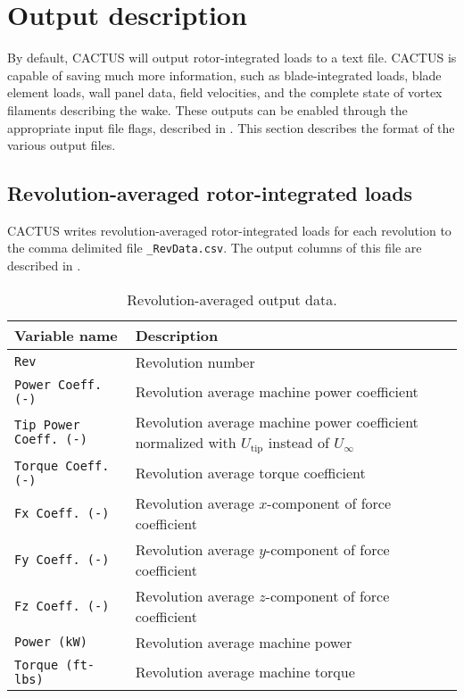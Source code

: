 \chapter{Output description}
By default, CACTUS will output rotor-integrated loads to a text file. CACTUS is capable of saving much more information, such as blade-integrated loads, blade element loads, wall panel data, field velocities, and the complete state of vortex filaments describing the wake. These outputs can be enabled through the appropriate input file flags, described in . This section describes the format of the various output files.

\section{Revolution-averaged rotor-integrated loads}
CACTUS writes revolution-averaged rotor-integrated loads for each revolution to the comma delimited file \texttt{\_RevData.csv}. The output columns of this file are described in .

\begin{table}[!htbp]
\centering
\caption{Revolution-averaged output data.}
\label{tbl:output_vars_rev}
\begin{tabular}{p{}p{}}
\toprule
Variable name & Description \\ \midrule
\texttt{Rev}                    & Revolution number \\
\texttt{Power Coeff. (-)}       & Revolution average machine power coefficient \\
\texttt{Tip Power Coeff. (-)}   & Revolution average machine power coefficient normalized with $U_\textrm{tip}$ instead of $U_\infty$ \\
\texttt{Torque Coeff. (-)}      & Revolution average torque coefficient \\
\texttt{Fx Coeff. (-)}          & Revolution average $x$-component of force coefficient \\
\texttt{Fy Coeff. (-)}          & Revolution average $y$-component of force coefficient \\
\texttt{Fz Coeff. (-)}          & Revolution average $z$-component of force coefficient \\
\texttt{Power (kW)}             & Revolution average machine power \\
\texttt{Torque (ft-lbs)}        & Revolution average machine torque \\
\bottomrule
\end{tabular}
\end{table}

